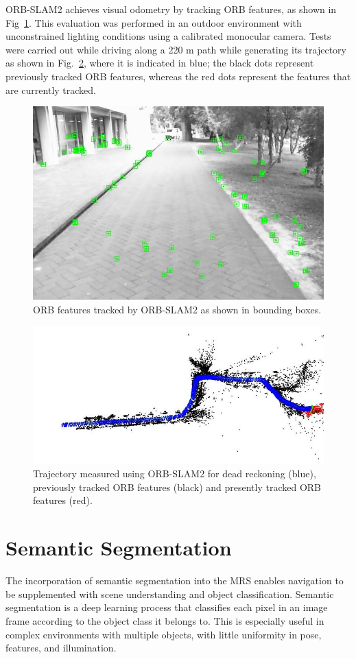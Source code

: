 ORB-SLAM2 achieves visual odometry by tracking ORB features, as shown in Fig~\ref{fig:4:orb1}. This evaluation was performed in an outdoor environment with unconstrained lighting conditions using a calibrated monocular camera. Tests were carried out while driving along a 220 m path while generating its trajectory as shown in Fig.~\ref{fig:4:orb2}, where it is indicated in blue; the black dots represent previously tracked ORB features, whereas the red dots represent the features that are currently tracked.

\begin{figure}[H]
	\centering
	\includegraphics[width=0.8\linewidth]{fig10}
	\caption[Tracked ORB features]{ORB features tracked by ORB-SLAM2 as shown in bounding boxes.}
	\label{fig:4:orb1}
\end{figure}

\begin{figure}[H]
	\centering
	\includegraphics[width=0.8\linewidth]{fig11}
	\caption[ORB-SLAM2 trajectory]{Trajectory measured using ORB-SLAM2 for dead reckoning (blue), previously tracked ORB features (black) and presently tracked ORB features (red).}
	\label{fig:4:orb2}
\end{figure}

\section{Semantic Segmentation}
The incorporation of semantic segmentation into the MRS enables navigation to be supplemented with scene understanding and object classification. Semantic segmentation is a deep learning process that classifies each pixel in an image frame according to the object class it belongs to. This is especially useful in complex environments with multiple objects, with little uniformity in pose, features, and illumination.

